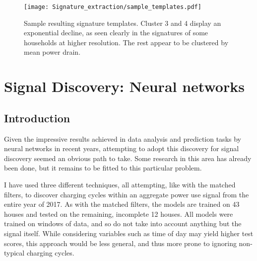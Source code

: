 \documentclass[12pt, american]{report}
\begin{document}
\clearpage

\begin{figure}%
\caption{Sample resulting signature templates. Cluster 3 and 4 display an exponential decline, as seen clearly in the signatures of some households at higher resolution.  The rest appear to be clustered by mean power drain.}
\label{fig:clustering_2}
\texttt{[image: Signature\_extraction/sample\_templates.pdf]}
\end{figure}
\chapter{Signal Discovery: Neural networks}
\section{Introduction}
Given the impressive results achieved in data analysis and prediction tasks by neural networks in recent years, attempting to adopt this discovery for signal discovery seemed an obvious path to take. Some research in this area has already been done, %
but it remains to be fitted to this particular problem.

I have used three different techniques, all attempting, like with the matched filters, to discover charging cycles within an aggregate power use signal from the entire year of 2017. As with the matched filters, the models are trained on 43 houses and tested on the remaining, incomplete 12 houses. All models were trained on windows of data, and so do not take into account anything but the signal itself. While considering variables such as time of day may yield higher test scores, this approach would be less general, and thus more prone to ignoring non-typical charging cycles.
\end{document}
